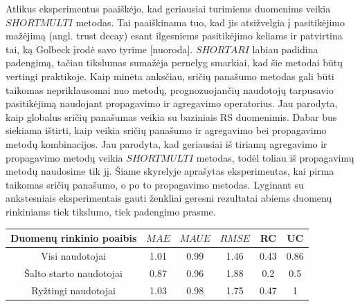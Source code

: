 \documentclass{VUMIFInfMagistrinis}
\begin{document}
\indent
Atlikus eksperimentus paaiškėjo, kad geriausiai turimiems duomenims veikia $SHORTMULTI$ metodas. Tai paaiškinama tuo, kad jis atsižvelgia į pasitikėjimo mažėjimą (angl. trust decay) esant ilgesniems pasitikėjimo keliams ir patvirtina tai, ką Golbeck įrodė savo tyrime [nuoroda]. $SHORTARI$ labiau padidina padengimą, tačiau tikslumas sumažėja pernelyg smarkiai, kad šie metodai būtų vertingi praktikoje.
\newline
\indent
Kaip minėta anksčiau, sričių panašumo metodas gali būti taikomas nepriklausomai nuo metodų, prognozuojančių naudotojų tarpusavio pasitikėjimą naudojant propagavimo ir agregavimo operatorius. Jau parodyta, kaip globalus sričių panašumas veikia su baziniais RS duomenimis. Dabar bus siekiama ištirti, kaip veikia sričių panašumo ir agregavimo bei propagavimo metodų kombinacijos. Jau parodyta, kad geriausiai iš tiriamų agregavimo ir propagavimo metodų veikia $SHORTMULTI$ metodas, todėl toliau iš propagavimų metodų naudosime tik jį.
\indent
Šiame skyrelyje aprašytas eksperimentas, kai pirma taikomas sričių panašumo, o po to propagavimo metodas. Lyginant su ankstesniais eksperimentais gauti ženkliai geresni rezultatai abiems duomenų rinkiniams tiek tikslumo, tiek padengimo prasme.
\begin{center}
	\begin{tabular}{||c c c c c c||} 
		Duomenų rinkinio poaibis & $MAE$ & $MAUE$ & $RMSE$ & RC & UC \\
		\hline
		Visi naudotojai & 1.01 & 0.99 & 1.46 & 0.43 & 0.86 \\
		\hline
		Šalto starto naudotojai & 0.87 & 0.96 & 1.88 & 0.2 & 0.5 \\
		\hline
		Ryžtingi naudotojai & 1.03 & 0.98 & 1.75 & 0.47 & 1 \\
	\end{tabular}
\end{center} 
\indent
\end{document}
